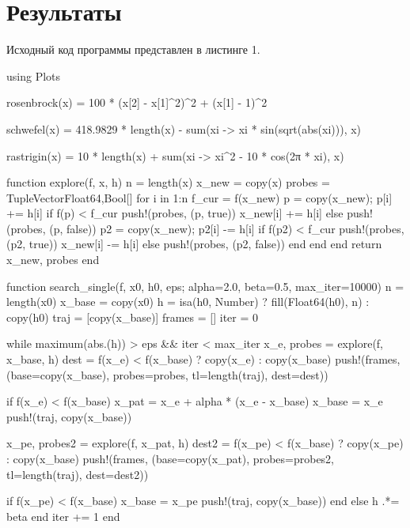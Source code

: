 \documentclass[a4paper, 14pt]{extarticle}
\begin{document}
\section{Результаты}\label{Sect::res}

Исходный код программы представлен в листинге 1.

\begin{breakablelisting}
using Plots

rosenbrock(x) = 100 * (x[2] - x[1]^2)^2 + (x[1] - 1)^2

schwefel(x) = 418.9829 * length(x) - sum(xi -> xi * sin(sqrt(abs(xi))), x)

rastrigin(x) = 10 * length(x) + sum(xi -> xi^2 - 10 * cos(2π * xi), x)

function explore(f, x, h)
    n = length(x)
    x_new = copy(x)
    probes = Tuple{Vector{Float64},Bool}[]
    for i in 1:n
        f_cur = f(x_new)
        p = copy(x_new); p[i] += h[i]
        if f(p) < f_cur
            push!(probes, (p, true))
            x_new[i] += h[i]
        else
            push!(probes, (p, false))
            p2 = copy(x_new); p2[i] -= h[i]
            if f(p2) < f_cur
                push!(probes, (p2, true))
                x_new[i] -= h[i]
            else
                push!(probes, (p2, false))
            end
        end
    end
    return x_new, probes
end

function search_single(f, x0, h0, eps; alpha=2.0, beta=0.5, max_iter=10000)
    n = length(x0)
    x_base = copy(x0)
    h = isa(h0, Number) ? fill(Float64(h0), n) : copy(h0)
    traj = [copy(x_base)]
    frames = []
    iter = 0

    while maximum(abs.(h)) > eps && iter < max_iter
        x_e, probes = explore(f, x_base, h)
        dest = f(x_e) < f(x_base) ? copy(x_e) : copy(x_base)
        push!(frames, (base=copy(x_base), probes=probes, tl=length(traj), dest=dest))

        if f(x_e) < f(x_base)
            x_pat = x_e + alpha * (x_e - x_base)
            x_base = x_e
            push!(traj, copy(x_base))

            x_pe, probes2 = explore(f, x_pat, h)
            dest2 = f(x_pe) < f(x_base) ? copy(x_pe) : copy(x_base)
            push!(frames, (base=copy(x_pat), probes=probes2, tl=length(traj), dest=dest2))

            if f(x_pe) < f(x_base)
                x_base = x_pe
                push!(traj, copy(x_base))
            end
        else
            h .*= beta
        end
        iter += 1
    end


\end{breakablelisting}
\end{document}
